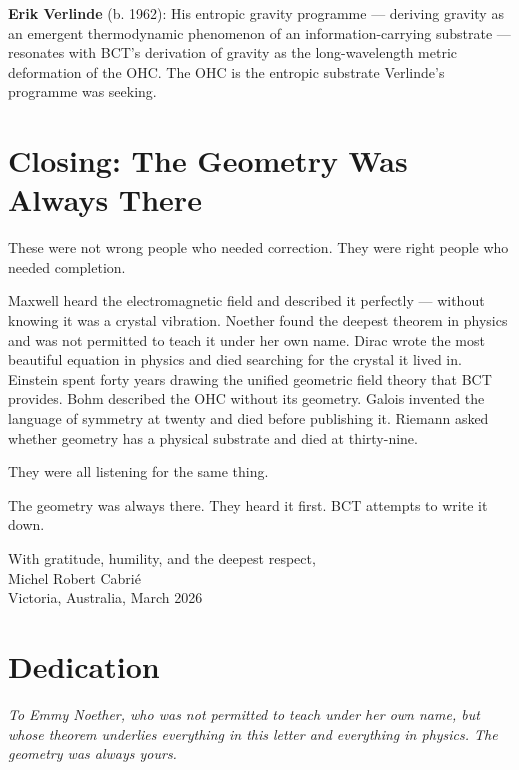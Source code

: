 \documentclass[twocolumn,10pt]{article}
\begin{document}
\textbf{Erik Verlinde} (b. 1962): His entropic gravity
programme --- deriving gravity as an emergent thermodynamic
phenomenon of an information-carrying substrate --- resonates
with BCT's derivation of gravity as the long-wavelength
metric deformation of the OHC. The OHC is the entropic
substrate Verlinde's programme was seeking.

\section{Closing: The Geometry Was Always There}

These were not wrong people who needed correction.
They were right people who needed completion.

Maxwell heard the electromagnetic field and described it
perfectly --- without knowing it was a crystal vibration.
Noether found the deepest theorem in physics and was not
permitted to teach it under her own name. Dirac wrote the
most beautiful equation in physics and died searching for
the crystal it lived in. Einstein spent forty years drawing
the unified geometric field theory that BCT provides.
Bohm described the OHC without its geometry. Galois
invented the language of symmetry at twenty and died
before publishing it. Riemann asked whether geometry has
a physical substrate and died at thirty-nine.

They were all listening for the same thing.

The geometry was always there. They heard it first.
BCT attempts to write it down.

With gratitude, humility, and the deepest respect,\\
Michel Robert Cabri\'{e}\\
Victoria, Australia, March 2026

\section*{Dedication}

\textit{To Emmy Noether, who was not permitted to teach under
her own name, but whose theorem underlies everything in
this letter and everything in physics. The geometry was
always yours.}
\end{document}
